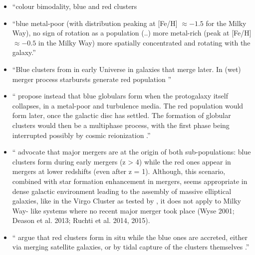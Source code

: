 \documentclass[a4paper,fleqn,usenatbib]{mnras}
\begin{document}
\begin{itemize}
    \item ``colour bimodality, blue and red clusters \citep[e.g.][]{1985ApJ...293..424Z, 1999AJ....118.1526G, 2001AJ....121.2974L, 2006ApJ...639...95P}
    \item ``blue metal-poor (with distribution peaking at [Fe/H] $\approx -1.5$ for the Milky Way), no sign of rotation as a population (..) more metal-rich (peak at [Fe/H] $\approx -0.5$ in the Milky  Way) more spatially concentrated and rotating with the galaxy.'' \citep{1996AJ....112.1487H}
    \item ``Blue clusters from in early Universe in galaxies that merge later. In (wet) merger process starbursts generate red population \cite{1992ApJ...384...50A, 1987nngp.proc...18S}''
    \item ``\citet{1997AJ....113.1652F} propose instead that blue globulars form when the protogalaxy itself collapses, in a metal-poor and turbulence media. The red population would form later, once the galactic disc has settled. The formation of globular clusters would then be a multiphase process, with the first phase being interrupted possibly by cosmic reionization \citep{2002MNRAS.333..383B}.''
    \item ``\citet{2005ApJ...623..650K, 2014ApJ...796...10L} advocate
that major mergers are at the origin of both sub-populations: blue
clusters form during early mergers (z > 4) while the red ones appear
in mergers at lower redshifts (even after z = 1). Although, this
scenario, combined with star formation enhancement in mergers,
seems appropriate in dense galactic environment leading to the
assembly of massive elliptical galaxies, like in the Virgo Cluster
as tested by \citet{2014ApJ...796...10L}, it does not apply to Milky Way-
like systems where no recent major merger took place (Wyse 2001;
Deason et al. 2013; Ruchti et al. 2014, 2015).
\item ``\citet{1998ApJ...501..554C} argue that red clusters form in situ while the blue ones are accreted, either via merging satellite galaxies, or by tidal capture of the clusters themselves \citep[see also][]{2013ApJ...762...39T}.''
\end{itemize}
\end{document}
